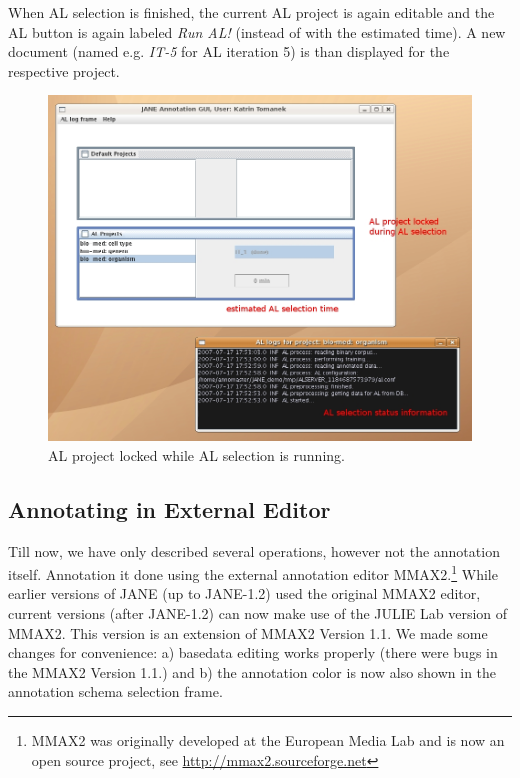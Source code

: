\documentclass[DIV12,english,11pt,halfparskip]{scrartcl}
\begin{document}
When AL selection is finished, the current AL project is again
editable and the AL button is again labeled \emph{Run AL!} (instead of
with the estimated time). A new document (named e.g. \emph{IT-5}
for AL iteration 5) is than displayed for the respective project.

\begin{figure}[h]
  \centering
  \includegraphics[scale=0.5]{figs/ALSelection.jpg}
  \caption{AL project locked while AL selection is running.}
  \label{fig:alselection}
\end{figure}



\subsection{Annotating in External Editor}
Till now, we have only described several operations, however not the
annotation itself. Annotation it done using the external annotation
editor MMAX2.\footnote{MMAX2 was originally developed at the European
  Media Lab and is now an open source project, see
  \url{http://mmax2.sourceforge.net}} While earlier versions of JANE
(up to JANE-1.2) used the original MMAX2 editor, current versions
(after JANE-1.2) can now make use of the JULIE Lab version of
MMAX2. This version is an extension of MMAX2 Version 1.1. We made some
changes for convenience: a) basedata editing works properly (there
were bugs in the MMAX2 Version 1.1.) and b) the annotation color is
now also shown in the annotation schema selection frame.
\end{document}
